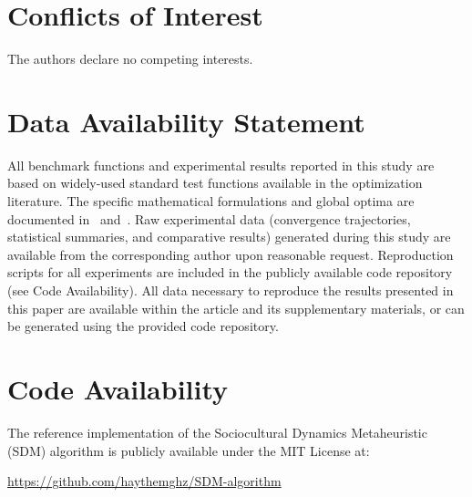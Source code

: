 \documentclass[11pt]{article}
\begin{document}
\section*{Conflicts of Interest}
The authors declare no competing interests.

\section*{Data Availability Statement}
All benchmark functions and experimental results reported in this study are based on widely-used standard test functions available in the optimization literature. The specific mathematical formulations and global optima are documented in~\cite{liang2013problem} and~\cite{hansen2009real}. Raw experimental data (convergence trajectories, statistical summaries, and comparative results) generated during this study are available from the corresponding author upon reasonable request. Reproduction scripts for all experiments are included in the publicly available code repository (see Code Availability). All data necessary to reproduce the results presented in this paper are available within the article and its supplementary materials, or can be generated using the provided code repository.

\section*{Code Availability}

The reference implementation of the Sociocultural Dynamics Metaheuristic (SDM) algorithm is publicly available under the MIT License at:

\begin{center}
\url{https://github.com/haythemghz/SDM-algorithm}
\end{center}
\end{document}

